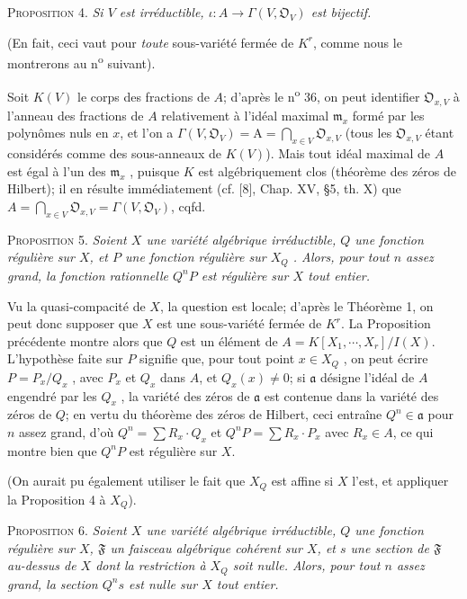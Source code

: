 \textsc{Proposition} 4. \textit{Si $V$ est irréductible, $\iota : A \to \Gamma(V, \mathfrak{O}_V)$ est bijectif.}

(En fait, ceci vaut pour \textit{toute} sous-variété fermée de $K^r$, comme nous le montrerons au n\textsuperscript{o} suivant).

Soit $K(V)$ le corps des fractions de $A$; d'après le n\textsuperscript{o} 36, on peut identifier $\mathfrak{O}_{x,V}$ à l'anneau des fractions de $A$ relativement à l'idéal maximal $\mathfrak{m}_x$ formé par les polynômes nuls en $x$, et l'on a $\Gamma(V, \mathfrak{O}_V) = \mathrm{A} = \bigcap_{x \in V} \mathfrak{O}_{x,V}$ (tous les $\mathfrak{O}_{x,V}$ étant considérés comme des sous-anneaux de $K(V)$). Mais tout idéal maximal de $A$ est égal à l'un des $\mathfrak{m}_x$ , puisque $K$ est algébriquement clos (théorème des zéros de Hilbert); il en résulte immédiatement (cf. [8], Chap. XV, §5, th. X) que $A = \bigcap_{x \in V} \mathfrak{O}_{x,V} = \Gamma(V, \mathfrak{O}_V)$, cqfd.

\textsc{Proposition} 5. \textit{Soient $X$ une variété algébrique irréductible, $Q$ une fonction régulière sur $X$, et $P$ une fonction régulière sur $X_Q$ . Alors, pour tout $n$ assez grand, la fonction rationnelle $Q^nP$ est régulière sur $X$ tout entier.}

Vu la quasi-compacité de $X$, la question est locale; d'après le Théorème 1, on peut donc supposer que $X$ est une sous-variété fermée de $K^r$. La Proposition précédente montre alors que $Q$ est un élément de $A = K[X_1 , \cdots , X_r]/I(X)$. L'hypothèse faite sur $P$ signifie que, pour tout point $x \in X_Q$ , on peut écrire $P = P_x/Q_x$ , avec $P_x$ et $Q_x$ dans $A$, et $Q_x(x) \neq 0$; si $\mathfrak{a}$ désigne l'idéal de $A$ engendré par les $Q_x$ , la variété des zéros de $\mathfrak{a}$ est contenue dans la variété des zéros de $Q$; en vertu du théorème des zéros de Hilbert, ceci entraîne $Q^n \in \mathfrak{a}$ pour $n$ assez grand, d'où $Q^n = \sum R_x \cdot Q_x$ et $Q^nP = \sum R_x \cdot P_x$ avec $R_x \in A$, ce qui montre bien que $Q^nP$ est régulière sur $X$.

(On aurait pu également utiliser le fait que $X_Q$ est affine si $X$ l'est, et appliquer la Proposition 4 à $X_Q$).

\textsc{Proposition} 6. \textit{Soient $X$ une variété algébrique irréductible, $Q$ une fonction régulière sur $X$, $\mathfrak{F}$ un faisceau algébrique cohérent sur $X$, et $s$ une section de $\mathfrak{F}$ au-dessus de $X$ dont la restriction à $X_Q$ soit nulle. Alors, pour tout $n$ assez grand, la section $Q^ns$ est nulle sur $X$ tout entier.}

